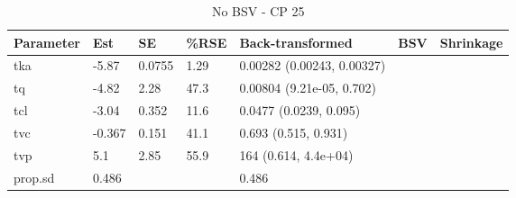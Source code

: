 \begin{table}
\centering\centering
\caption{No BSV - CP 25}
\centering
\fontsize{8}{10}\selectfont
\begin{tabular}[t]{lllllll}
\toprule
\textbf{Parameter} & \textbf{Est} & \textbf{SE} & \textbf{\%RSE} & \textbf{Back-transformed} & \textbf{BSV} & \textbf{Shrinkage}\\
\midrule
tka & -5.87 & 0.0755 & 1.29 & 0.00282 (0.00243, 0.00327) &  & \\
\midrule
tq & -4.82 & 2.28 & 47.3 & 0.00804 (9.21e-05, 0.702) &  & \\
\midrule
tcl & -3.04 & 0.352 & 11.6 & 0.0477 (0.0239, 0.095) &  & \\
\midrule
tvc & -0.367 & 0.151 & 41.1 & 0.693 (0.515, 0.931) &  & \\
\midrule
tvp & 5.1 & 2.85 & 55.9 & 164 (0.614, 4.4e+04) &  & \\
\midrule
prop.sd & 0.486 &  &  & 0.486 &  & \\
\bottomrule
\end{tabular}
\end{table}